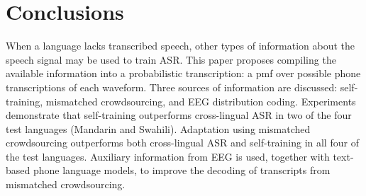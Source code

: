 
\section{Conclusions}

When a language lacks transcribed speech, other types of information
about the speech signal may be used to train ASR.  This paper proposes
compiling the available information into a probabilistic
transcription: a pmf over possible phone transcriptions of each
waveform.  Three sources of information are discussed: self-training,
mismatched crowdsourcing, and EEG distribution coding.  Experiments
demonstrate that self-training outperforms cross-lingual ASR in two of
the four test languages (Mandarin and Swahili).  Adaptation using
mismatched crowdsourcing outperforms both cross-lingual ASR and
self-training in all four of the test languages.  Auxiliary
information from EEG is used, together with text-based phone language
models, to improve the decoding of transcripts from mismatched
crowdsourcing.  
